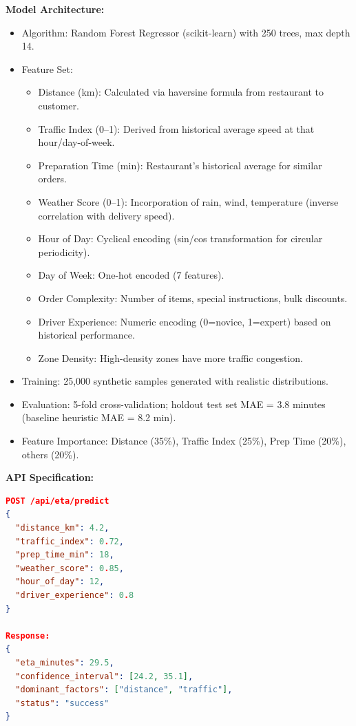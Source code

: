 \documentclass[12pt,a4paper]{report}
\begin{document}
\begin{itemize}
\textbf{Model Architecture:}
\begin{itemize}
    \item Algorithm: Random Forest Regressor (scikit-learn) with 250 trees, max depth 14.
    \item Feature Set:
    \begin{itemize}
        \item Distance (km): Calculated via haversine formula from restaurant to customer.
        \item Traffic Index (0--1): Derived from historical average speed at that hour/day-of-week.
        \item Preparation Time (min): Restaurant's historical average for similar orders.
        \item Weather Score (0--1): Incorporation of rain, wind, temperature (inverse correlation with delivery speed).
        \item Hour of Day: Cyclical encoding (sin/cos transformation for circular periodicity).
        \item Day of Week: One-hot encoded (7 features).
        \item Order Complexity: Number of items, special instructions, bulk discounts.
        \item Driver Experience: Numeric encoding (0=novice, 1=expert) based on historical performance.
        \item Zone Density: High-density zones have more traffic congestion.
    \end{itemize}
    \item Training: 25,000 synthetic samples generated with realistic distributions.
    \item Evaluation: 5-fold cross-validation; holdout test set MAE = 3.8 minutes (baseline heuristic MAE = 8.2 min).
    \item Feature Importance: Distance (35\%), Traffic Index (25\%), Prep Time (20\%), others (20\%).
\end{itemize}

\textbf{API Specification:}
\begin{lstlisting}[language=json, caption={ETA Predictor Endpoint}]
POST /api/eta/predict
{
  "distance_km": 4.2,
  "traffic_index": 0.72,
  "prep_time_min": 18,
  "weather_score": 0.85,
  "hour_of_day": 12,
  "driver_experience": 0.8
}

Response:
{
  "eta_minutes": 29.5,
  "confidence_interval": [24.2, 35.1],
  "dominant_factors": ["distance", "traffic"],
  "status": "success"
}
\end{lstlisting}


\end{itemize}
\end{document}

